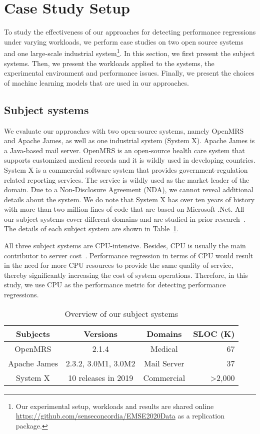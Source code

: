 \section{Case Study Setup} \label{sec:casestudysetup}
To study the effectiveness of our approaches for detecting performance regressions under varying workloads, we perform case studies on two open source systems and one large-scale industrial system\footnote{Our experimental setup, workloads and results are shared online \url{https://github.com/senseconcordia/EMSE2020Data} as a replication package.}. In this section, we first present the subject systems. Then, we present the workloads applied to the systems, the experimental environment and performance issues. Finally, we present the choices of machine learning models that are used in our approaches. 

\subsection{Subject systems}
We evaluate our approaches with two open-source systems, namely OpenMRS and Apache James, as well as one industrial system (System X). Apache James is a Java-based mail server. OpenMRS is an open-source health care system that supports customized medical records and it is wildly used in developing countries. System X is a commercial software system that provides government-regulation related reporting services. The service is wildly used as the market leader of the domain. Due to a Non-Disclosure Agreement (NDA), we cannot reveal additional details about the system. We do note that System X has over ten years of history with more than two million lines of code that are based on Microsoft .Net. All our subject systems cover different domains and are studied in prior research~\citep{Yao:2018:LSL:3184407.3184416, DBLP:conf/icst/GaoJBL16}. The details of each subject system are shown in Table~\ref{tab:subjects}. 

All three subject systems are CPU-intensive. Besides, CPU is usually the main contributor to server cost~\citep{Greenberg:2008:CCR:1496091.1496103}. Performance regression in terms of CPU would result in the need for more CPU resources to provide the same quality of service, thereby significantly increasing the cost of system operations.
Therefore, in this study, we use CPU as the performance metric for detecting performance regressions.


\begin{table}[tbh]
  \centering
  \caption{Overview of our subject systems}
    \begin{tabular}{c|c|c|r}
    \hline
    Subjects & Versions & Domains & SLOC (K) \\
    \hline
    OpenMRS & 2.1.4 & Medical & 67 \\
    
    Apache James & 2.3.2, 3.0M1, 3.0M2 & Mail Server & 37 \\
    
    System X & 10 releases in 2019 & Commercial & \textgreater 2,000 \\
    \hline
    \end{tabular}%
  \label{tab:subjects}%
\end{table}%


